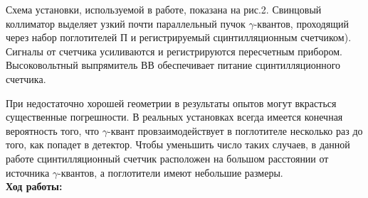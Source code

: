 \documentclass[a4paper, 12pt]{article}%
\begin{document}
	Схема установки, используемой в работе, показана на рис.2. Свинцовый коллиматор выделяет узкий почти параллельный пучок $\gamma$-квантов, проходящий через набор поглотителей П и регистрируемый сцинтилляционным счетчиком). Сигналы от счетчика усиливаются и регистрируются пересчетным прибором. Высоковольтный выпрямитель ВВ обеспечивает питание сцинтилляционного счетчика.
	
	При недостаточно хорошей геометрии в результаты опытов могут
	вкрасться существенные погрешности. В реальных установках всегда имеется конечная вероятность того, что $\gamma$-квант провзаимодействует в
	поглотителе несколько раз до того, как попадет в детектор. Чтобы уменьшить число таких случаев, в данной работе сцинтилляционный счетчик расположен на большом расстоянии от источника $\gamma$-квантов, а поглотители имеют небольшие
	размеры.\\
	
	\textbf{Ход работы: }\\
	
\end{document}
